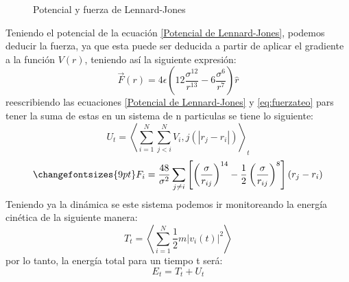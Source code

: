 \documentclass[12pt,letterpaper]{article}
\begin{document}
\begin{multicols}{2}
\begin{figure}[H]
    \caption{Potencial y fuerza de Lennard-Jones}
    \label{pot-len-jones}
\end{figure}
Teniendo el potencial de la ecuación \ref{Potencial de Lennard-Jones}, podemos deducir la fuerza, ya que esta puede ser deducida a partir de aplicar el gradiente a la función $V(r)$, teniendo así la siguiente expresión:
\begin{equation}
    \label{eq:fuerzateo}
    \vec{F}(r)= 4\epsilon \left(12\frac{\sigma^{12}}{r^{13}}- 6 \frac{\sigma^6}{r^7} \right) \hat{r}
\end{equation}
reescribiendo las ecuaciones \ref{Potencial de Lennard-Jones} y \ref{eq:fuerzateo} pars tener la suma de estas en un sistema de n particulas se tiene lo siguiente:
\begin{equation}
    \label{eq:pot-n}
    U_t=\left\langle\sum_{i=1}^N \sum_{j<i}^N V_i,j(|r_j-r_i|)\right\rangle_t
\end{equation}
\begin{equation}
    \changefontsizes{9pt}
    \label{eq:f-n}
    F_i = \frac{48}{\sigma^2} \sum_{j \ne i} \left[\left(\frac{\sigma}{r_{ij}}\right)^{14}-\frac{1}{2}\left(\frac{\sigma}{r_{ij}} \right)^8  \right] (r_j-r_i)
\end{equation}
Teniendo ya la dinámica se este sistema podemos ir monitoreando la energía cinética de la siguiente manera:
\begin{equation}
    \label{eq:kin-n}
    T_t=\left\langle \sum_{i=1}^N \frac{1}{2}m|v_i(t)|^2\right\rangle
\end{equation}
por lo tanto, la energía total para un tiempo t será:
\begin{equation}
    \label{eq:e-tot}
    E_t=T_t+U_t
\end{equation}

\end{multicols}
\end{document}
